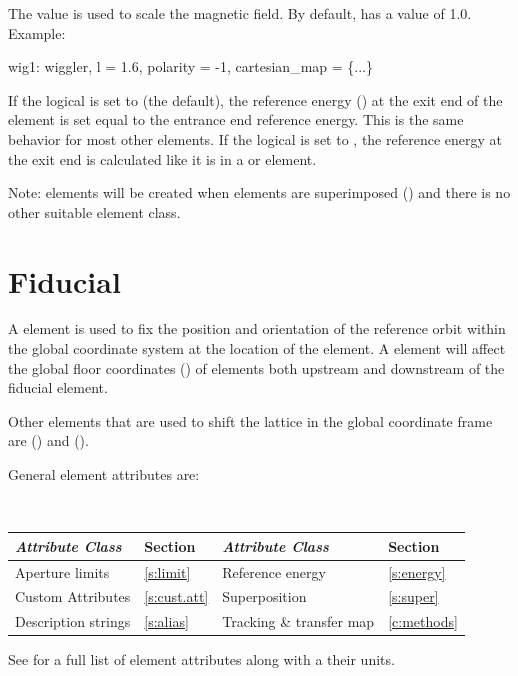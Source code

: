 The  value is used to scale the magnetic field. By
default,  has a value of 1.0.  Example:
\begin{example}
  wig1: wiggler, l = 1.6, polarity = -1, cartesian_map = \{...\}
\end{example}

If the  logical is set to  (the default), the reference energy
() at the exit end of the element is set equal to the entrance end reference
energy. This is the same behavior for most other elements. If the  logical
is set to , the reference energy at the exit end is calculated like it is in a
 or  element.

Note:  elements will be created when elements are superimposed () and there is
no other suitable element class.

\newpage

\section{Fiducial}
\label{s:fiducial}

A  element is used to fix the position and orientation of the reference orbit within
the global coordinate system at the location of the  element. A  element
will affect the global floor coordinates () of elements both upstream and downstream
of the fiducial element.

Other elements that are used to shift the lattice in the global coordinate frame are
 () and  ().

General  element attributes are:
\begin{center}
\tt
\begin{tabular}{llll} \toprule
  {\sl Attribute Class}      & Section           & {\sl Attribute Class}      & Section         \\ \midrule
  Aperture limits            & \ref{s:limit}     & Reference energy           & \ref{s:energy}  \\
  Custom Attributes          & \ref{s:cust.att}  & Superposition              & \ref{s:super}   \\
  Description strings        & \ref{s:alias}     & Tracking \& transfer map   & \ref{c:methods} \\ 
  \bottomrule
\end{tabular}
\end{center}
\toffset
See  for a full list of element attributes along with a their units.

